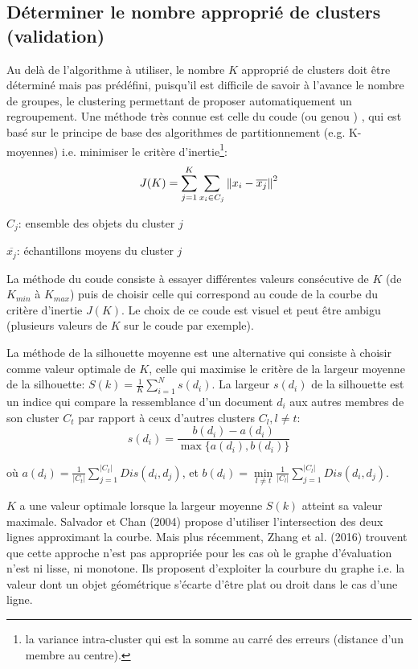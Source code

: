 \subsection{Déterminer le nombre approprié de clusters (validation)}


 Au delà de l’algorithme à utiliser, le nombre $K$ approprié de clusters doit être déterminé mais pas prédéfini, puisqu'il est difficile de savoir à l'avance le nombre de groupes, le clustering permettant de proposer automatiquement un regroupement. Une méthode très connue est celle du \og coude \fg{}  (ou \og genou \fg{}) \citep{halkidi2001clustvalidation}, qui est basé sur le principe de base des algorithmes de partitionnement (e.g. K-moyennes) i.e. minimiser le critère d'inertie\footnote{la variance intra-cluster qui est la somme au carré des erreurs (distance d'un membre au centre).}:
\[J(K) = \sum\limits_{j=1}^K\sum\limits_{x_i \in C_j}\left\lVert x_i-\overline{x_j}\right\rVert^2\]

$C_j$: ensemble des objets du cluster $j$

$\overline{x_j}$: échantillons moyens du cluster $j$

La méthode du coude consiste à essayer différentes valeurs consécutive de $K$ (de $K_{min}$ à $K_{max}$) puis de choisir celle qui correspond au coude de la courbe du critère d'inertie $J(K)$. Le choix de ce coude est visuel et peut être ambigu (plusieurs valeurs de $K$ sur le coude par exemple). 

La méthode de la silhouette moyenne \citep{rousseeuw1987silhouetteclusternumber} est une alternative qui consiste à choisir comme valeur optimale de $K$, celle qui maximise le critère de la largeur moyenne de la silhouette: $S(k) = \frac{1}{K}\sum\limits_{i=1}^N s(d_i)$. La largeur $s(d_i)$ de la silhouette est un indice qui compare la ressemblance d'un document $d_i$ aux autres membres de son cluster $C_t$ par rapport à ceux d'autres clusters $C_l, l \neq t$:
\[s(d_i) = \frac{b(d_i) - a(d_i)}{\max\lbrace a(d_i),b(d_i)\rbrace}\]

où $a(d_i) = \frac{1}{\vert C_t \vert} \sum\limits_{j=1}^{\vert C_t \vert} Dis(d_i, d_j)$, et $b(d_i) = \min\limits_{l \neq t} \frac{1}{\vert C_l \vert} \sum\limits_{j=1}^{\vert C_l \vert} Dis(d_i, d_j)$.

$K$ a une valeur optimale lorsque la largeur moyenne $S(k)$ atteint sa valeur maximale. Salvador et Chan (2004) propose d’utiliser l’intersection des deux lignes approximant la courbe. Mais plus récemment, Zhang et al. (2016) trouvent que cette approche n’est pas appropriée pour les cas où le graphe d’évaluation n’est ni lisse, ni monotone. Ils proposent d’exploiter la courbure du graphe i.e. la valeur dont un objet géométrique s'écarte d'être plat ou droit dans le cas d'une ligne.

